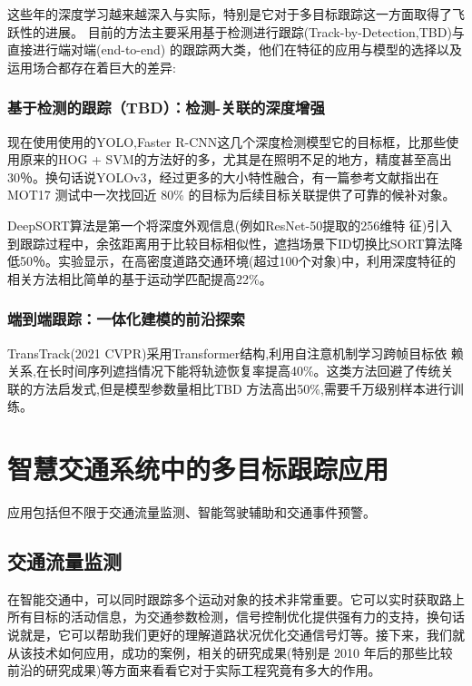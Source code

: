 这些年的深度学习越来越深入与实际，特别是它对于多目标跟踪这一方面取得了飞跃性的进展。 目前的方法主要采用基于检测进行跟踪(Track-by-Detection,TBD)与直接进行端对端(end-to-end) 的跟踪两大类，他们在特征的应用与模型的选择以及运用场合都存在着巨大的差异:


\subsubsection{基于检测的跟踪（TBD）：检测-关联的深度增强}



现在使用使用的YOLO,Faster R-CNN这几个深度检测模型它的目标框，比那些使用原来的HOG + SVM的方法好的多，尤其是在照明不足的地方，精度甚至高出30％。换句话说YOLOv3，经过更多的大小特性融合，有一篇参考文献\cite{ren2015faster}指出在 MOT17 测试中一次找回近 80\% 的目标为后续目标关联提供了可靠的候补对象。

DeepSORT算法是第一个将深度外观信息(例如ResNet-50提取的256维特 征)引入到跟踪过程中，余弦距离用于比较目标相似性，遮挡场景下ID切换比SORT算法降低50％。实验显示，在高密度道路交通环境(超过100个对象)中，利用深度特征的相关方法相比简单的基于运动学匹配提高22\%。





\subsubsection{端到端跟踪：一体化建模的前沿探索}


TransTrack\cite{zhang2021transtrack}(2021 CVPR)采用Transformer结构,利用自注意机制学习跨帧目标依 赖关系,在长时间序列遮挡情况下能将轨迹恢复率提高40\%。这类方法回避了传统关联的方法启发式,但是模型参数量相比TBD 方法高出50\%,需要千万级别样本进行训练。





\section{智慧交通系统中的多目标跟踪应用}

应用包括但不限于交通流量监测、智能驾驶辅助和交通事件预警。

\subsection{交通流量监测}

在智能交通中，可以同时跟踪多个运动对象的技术非常重要。它可以实时获取路上所有目标的活动信息，为交通参数检测，信号控制优化提供强有力的支持，换句话说就是，它可以帮助我们更好的理解道路状况优化交通信号灯等。接下来，我们就从该技术如何应用，成功的案例，相关的研究成果(特别是 2010 年后的那些比较前沿的研究成果)等方面来看看它对于实际工程究竟有多大的作用。

